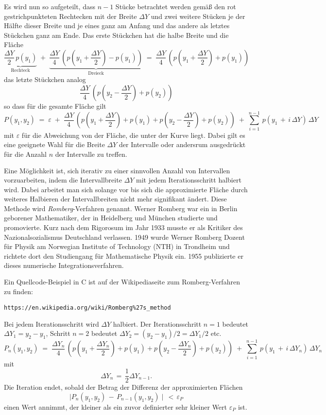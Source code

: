 Es wird nun so aufgeteilt, dass $n-1$ Stücke betrachtet werden gemäß den rot
gestrichpunkteten Rechtecken mit der Breite $\Delta Y$ und zwei weitere Stücken je
der Hälfte dieser Breite und je eines ganz am Anfang und das andere als letztes
Stückchen ganz am Ende.
Das erste Stückchen hat die halbe Breite und die Fläche
$$
\underbrace{\frac{\Delta Y}{2} \, p(y_1)}_{\mathrm{Rechteck}}
 \; + \;
\underbrace{\frac{\Delta Y}{4} \, (p(y_1 + \frac{\Delta Y}{2}) - p(y_1))}_{\mathrm{Dreieck}}
\; = \;
\frac{\Delta Y}{4} \, (p(y_1 + \frac{\Delta Y}{2}) + p(y_1))
$$
das letzte Stückchen analog
$$
\frac{\Delta Y}{4} \, (p(y_2 - \frac{\Delta Y}{2}) + p(y_2))
$$
so dass für die gesamte Fläche gilt
\begin{equation}
P(y_1, y_2) \; = \; \varepsilon \; + \;
\frac{\Delta Y}{4} \, \left(p(y_1 + \frac{\Delta Y}{2}) + p(y_1) +
p(y_2 - \frac{\Delta Y}{2}) + p(y_2)\right) \; + \;
\sum\limits_{i=1}^{n-1} \,
p(y_1 \, + \, i \, \Delta Y) \, \Delta Y
\end{equation}
mit $\varepsilon$ für die Abweichung von der Fläche, die unter der Kurve liegt.
Dabei gilt es eine geeignete Wahl für die Breite $\Delta Y$ der Intervalle
oder andersrum ausgedrückt für die Anzahl $n$ der Intervalle zu treffen.

Eine Möglichkeit ist, sich iterativ zu einer sinnvollen Anzahl von Intervallen
vorzuarbeiten, indem die Intervallbreite $\Delta Y$ mit jedem Iterationsschritt halbiert wird.
Dabei arbeitet man sich solange vor bis sich die approximierte Fläche
durch weiteres Halbieren der Intervallbreiten nicht mehr
signifikant ändert. Diese Methode wird \textsl{Romberg}-Verfahren genannt.
Werner Romberg war ein in Berlin geborener Mathematiker, der in Heidelberg und München
studierte und promovierte. Kurz nach dem Rigorosum im Jahr 1933 musste er als Kritiker
des Nazionalsozialismus Deutschland verlassen. 1949 wurde Werner Romberg Dozent für Physik
am Norwegian Institute of Technology (NTH) in Trondheim und richtete dort den Studiengang
für Mathematische Physik ein. 1955 publizierte er dieses numerische Integrationsverfahren.

Ein Quellcode-Beispiel in C ist auf der Wikipediaseite zum Romberg-Verfahren zu finden:
\begin{verbatim}
https://en.wikipedia.org/wiki/Romberg%27s_method
\end{verbatim}
Bei jedem Iterationsschritt wird $\Delta Y$ halbiert.
Der Iterationsschritt $n = 1$ bedeutet $\Delta Y_1 = y_2 - y_1$, Schritt $n = 2$
bedeutet $\Delta Y_2 = (y_2 - y_1)/2 = \Delta Y_1/2$ etc.
\begin{equation}
P_n (y_1, y_2) \; = \;
\frac{\Delta Y_n}{4} \, (p(y_1 + \frac{\Delta Y_n}{2}) + p(y_1) +
p(y_2 - \frac{\Delta Y_n}{2}) + p(y_2)) \; + \;
\sum\limits_{i=1}^{n-1} \,
p(y_1 \, + \, i \, \Delta Y_n) \, \Delta Y_n
\end{equation}
mit
$$
 \Delta Y_n \, = \, \frac{1}{2} \Delta Y_{n-1} .
$$
Die Iteration endet, sobald der Betrag der Differenz der approximierten Flächen
\begin{equation}
\mid P_n (y_1, y_2) \, - \, P_{n-1} (y_1, y_2) \mid \, < \, \varepsilon_P
\end{equation}
einen Wert annimmt, der kleiner als ein zuvor definierter sehr kleiner Wert $\varepsilon_P$ ist.

